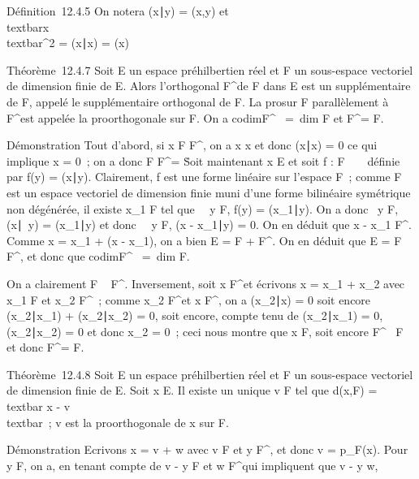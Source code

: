 \documentclass[]{article}
\begin{document}
Définition~12.4.5 On notera (x∣y) = \phi(x,y) et
\\textbar{}x\\textbar{}^2 =
(x∣x) = \Phi(x)

Théorème~12.4.7 Soit E un espace préhilbertien réel et F un sous-espace
vectoriel de dimension finie de E. Alors l'orthogonal F^\bot de
F dans E est un supplémentaire de F, appelé le supplémentaire orthogonal
de F. La pro\jmathection sur F parallèlement à F^\bot est appelée la
pro\jmathection orthogonale sur F. On a
codimF^\bot~ =\
dim F et F^\bot\bot = F.

Démonstration Tout d'abord, si x \in F \bigcap F^\bot, on a x \bot x et
donc (x∣x) = 0 ce qui implique x = 0~; on a
donc F \bigcap F^\bot = \0\. Soit
maintenant x \in E et soit f : F \rightarrow~ ~ définie par f(y) =
(x∣y). Clairement, f est une forme linéaire
sur l'espace F~; comme F est un espace vectoriel de dimension finie muni
d'une forme bilinéaire symétrique non dégénérée, il existe x\_1
\in F tel que \forall~~y \in F, f(y) =
(x\_1∣y). On a donc
\forall~y \in F, (x\mathrel∣~y) =
(x\_1∣y) et donc
\forall~~y \in F, (x -
x\_1∣y) = 0. On en déduit que x -
x\_1 \in F^\bot. Comme x = x\_1 + (x -
x\_1), on a bien E = F + F^\bot. On en déduit que E = F
\oplus~ F^\bot, et donc que
codimF^\bot~ =\
dim F.

On a clairement F \subset~ F^\bot\bot. Inversement, soit x \in
F^\bot\bot et écrivons x = x\_1 + x\_2 avec
x\_1 \in F et x\_2 \in F^\bot~; comme x\_2 \in
F^\bot et x \in F^\bot\bot, on a
(x\_2∣x) = 0 soit encore
(x\_2∣x\_1) +
(x\_2∣x\_2) = 0, soit encore,
compte tenu de (x\_2∣x\_1) =
0, (x\_2∣x\_2) = 0 et donc
x\_2 = 0~; ceci nous montre que x \in F, soit encore
F^\bot\bot\subset~ F et donc F^\bot\bot = F.

Théorème~12.4.8 Soit E un espace préhilbertien réel et F un sous-espace
vectoriel de dimension finie de E. Soit x \in E. Il existe un unique v \in F
tel que d(x,F) =\\textbar{} x -
v\\textbar{}~; v est la pro\jmathection orthogonale de x sur
F.

Démonstration Ecrivons x = v + w avec v \in F et y \in F^\bot, et
donc v = p\_F(x). Pour y \in F, on a, en tenant compte de v - y \in
F et w \in F^\bot qui impliquent que v - y \bot w,
\end{document}
